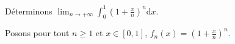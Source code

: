 \documentclass[french,11pt,twoside]{VcCours}
\newcommand{\dx}{\text{d}x}
\begin{document}
\newpage
\begin{Exemple} Déterminons $\lim_{n \rightarrow + \infty} \int_{0}^1 \left( 1 + \frac{x}{n}\right)^n \dx$.

\medskip

Posons pour tout $n \geq 1$ et $x \in [0,1]$, $f_n(x) = \left( 1 + \frac{x}{n}\right)^n$.

%
%
%
%
%

\end{Exemple}
\end{document}
